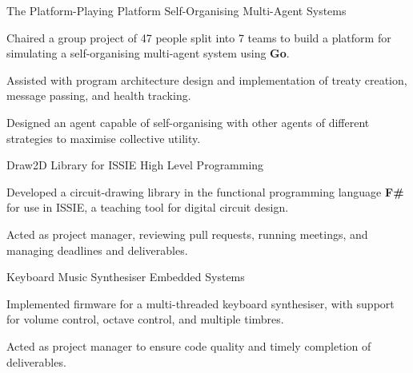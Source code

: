 

\begin{cvprojects}


  \cvproject
  {The Platform-Playing Platform} %
  {Self-Organising Multi-Agent Systems} %
  { %
      \begin{cvitems}
          \item Chaired a group project of 47 people split into 7 teams to build a platform for simulating a self-organising multi-agent system using \textbf{Go}.
          \item Assisted with program architecture design and implementation of treaty creation, message passing, and health tracking.
          \item Designed an agent capable of self-organising with other agents of different strategies to maximise collective utility.
      \end{cvitems}
  }

  \cvproject
  {Draw2D Library for ISSIE} %
  {High Level Programming} %
  { %
      \begin{cvitems}
          \item {Developed a circuit-drawing library in the functional programming language \textbf{F\#} for use in ISSIE, a teaching tool for digital circuit design.}%
          \item Acted as project manager, reviewing pull requests, running meetings, and managing deadlines and deliverables.
      \end{cvitems}
  }

  \cvproject
  {Keyboard Music Synthesiser} %
  {Embedded Systems} %
  { %
      \begin{cvitems}
          \item {Implemented firmware for a multi-threaded keyboard synthesiser, with support for volume control, octave control, and multiple timbres.}
          \item Acted as project manager to ensure code quality and timely completion of deliverables.
      \end{cvitems}
  }


\end{cvprojects}
